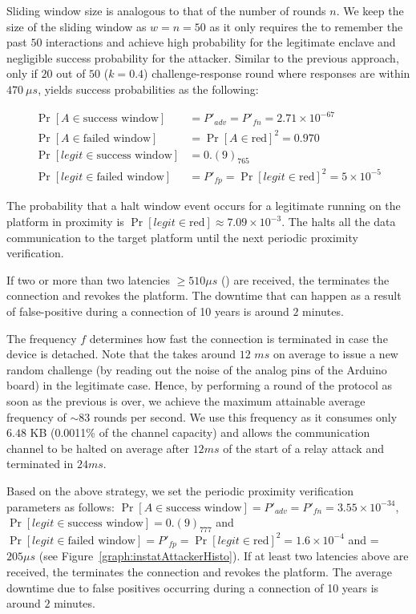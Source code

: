  Sliding window size is analogous to that of the number of rounds $n$. We keep  the size of the sliding window as $w=n=50$ as it only requires the \device to remember the past $50$ interactions and achieve high probability for the legitimate enclave and negligible success probability for the attacker. Similar to the previous approach, only if $20$ out of $50$ ($k=0.4$) challenge-response round where responses are within $470\ \mu s$, \name yields success probabilities as the following:

\begin{align*}
 \Pr[A \in \text{success window}]&=P'_{adv} = P'_{fn}= 2.71\times 10^{-67}\\
 \Pr[A \in \text{failed window}]&=\Pr[A\in\text{red}]^2=0.970\\
 \Pr[legit \in \text{success window}]&=0.(9)_765\\
 \Pr[legit \in \text{failed window}]&=P'_{fp}=\Pr[legit\in\text{red}]^2=5\times10^{-5}
\end{align*}

The probability that a halt window event occurs for a legitimate \app running on the platform in proximity is $\Pr[legit\in\text{red}]\approx 7.09\times10^{-3}$. The \device halts all the data communication to the target platform until the next periodic proximity verification.

If two or more than two latencies $\geq 510\mu s$ (\detach) are received, the \device terminates the connection and revokes the platform. The downtime that can happen as a result of false-positive during a connection of 10 years is around $2$ minutes.

 The frequency $f$ determines how fast the connection is terminated in case the \device device is detached. Note that the \device takes around $12$ $ms$ on average to issue a new random challenge (by reading out the noise of the analog pins of the Arduino board) in the legitimate case. Hence, by performing a round of the protocol as soon as the previous is over, we achieve the maximum attainable average frequency of $\sim83$ rounds per second. We use this frequency as it consumes only $6.48$ KB (0.0011\% of the 
channel capacity) and allows the communication channel to be halted on average after $12 ms$ of the start of a relay attack and terminated in $24 ms$.

Based on the above strategy, we set the periodic proximity verification parameters as follows: $\Pr[A \in \text{success window}]=P'_{adv} = P'_{fn}= 3.55\times 10^{-34}$, $\Pr[legit \in \text{success window}]=0.(9)_777$ and $\Pr[legit \in \text{failed window}]=P'_{fp}=\Pr[legit\in\text{red}]^2=1.6\times10^{-4}$ and \detach = $205 \mu s$ (see Figure~\ref{graph:instatAttackerHisto}). If at least two latencies above \detach are received, the \device terminates the connection and revokes the platform. The average downtime due to false positives occurring during a connection of 10 years is around $2$ minutes. 




